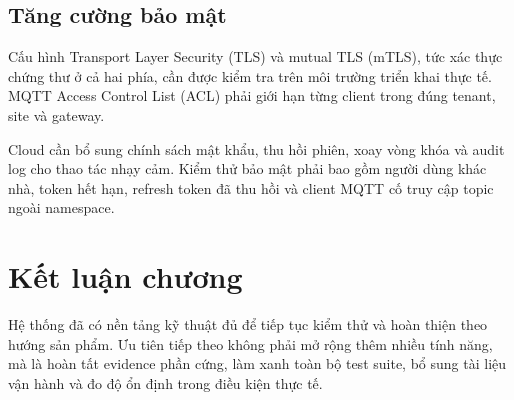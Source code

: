 \subsection{Tăng cường bảo mật}
\label{sec:ch6-security-future}

Cấu hình Transport Layer Security (TLS) và mutual TLS (mTLS), tức xác thực chứng thư ở cả hai phía, cần được kiểm tra trên môi trường triển khai thực tế. MQTT Access Control List (ACL) phải giới hạn từng client trong đúng tenant, site và gateway.

Cloud cần bổ sung chính sách mật khẩu, thu hồi phiên, xoay vòng khóa và audit log cho thao tác nhạy cảm. Kiểm thử bảo mật phải bao gồm người dùng khác nhà, token hết hạn, refresh token đã thu hồi và client MQTT cố truy cập topic ngoài namespace.

\section{Kết luận chương}

Hệ thống đã có nền tảng kỹ thuật đủ để tiếp tục kiểm thử và hoàn thiện theo hướng sản phẩm. Ưu tiên tiếp theo không phải mở rộng thêm nhiều tính năng, mà là hoàn tất evidence phần cứng, làm xanh toàn bộ test suite, bổ sung tài liệu vận hành và đo độ ổn định trong điều kiện thực tế.
